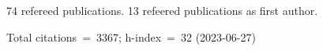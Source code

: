 74 refereed publications. 13 refeered publications as first author.

Total citations~=~3367; h-index~=~32 (2023-06-27)